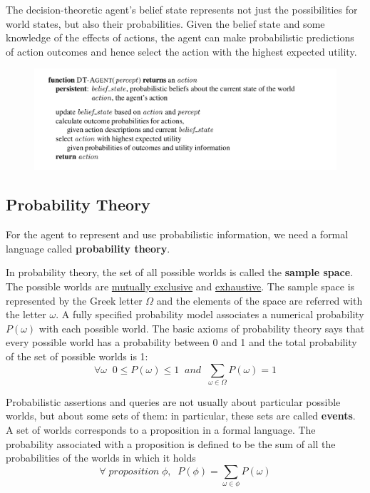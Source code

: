 \documentclass{article}
\begin{document}
The decision-theoretic agent's belief state represents not just the possibilities for world states, but also their probabilities. Given the belief state and some knowledge of the effects of actions, the agent can make probabilistic predictions of action outcomes and hence select the action with the highest expected utility.

\begin{figure}[h]
    \centering
    \includegraphics[width=1\linewidth]{algorithms/DT Agent.png}
    \label{fig:DT_agent_algorithm}
\end{figure}

\subsection{Probability Theory}
For the agent to represent and use probabilistic information, we need a formal language called \textbf{probability theory}.

In probability theory, the set of all possible worlds is called the \textbf{sample space}. The possible worlds are \underline{mutually exclusive} and \underline{exhaustive}. The sample space is represented by the Greek letter $\Omega$ and the elements of the space are referred with the letter $\omega$. A fully specified probability model associates a numerical probability $P(\omega)$ with each possible world. The basic axioms of probability theory says that every possible world has a probability between 0 and 1 and the total probability of the set of possible worlds is 1:
$$\forall\omega \;\; 0\le P(\omega) \le 1 \;\; and \;\; \sum_{\omega\in\Omega}P(\omega) = 1$$

Probabilistic assertions and queries are not usually about particular possible worlds, but about some sets of them: in particular, these sets are called \textbf{events}. A set of worlds corresponds to a proposition in a formal language. The probability associated with a proposition is defined to be the sum of all the probabilities of the worlds in which it holds
$$\forall \; proposition \; \phi, \;\; P(\phi)=\sum_{\omega\in\phi}P(\omega)$$
\end{document}
